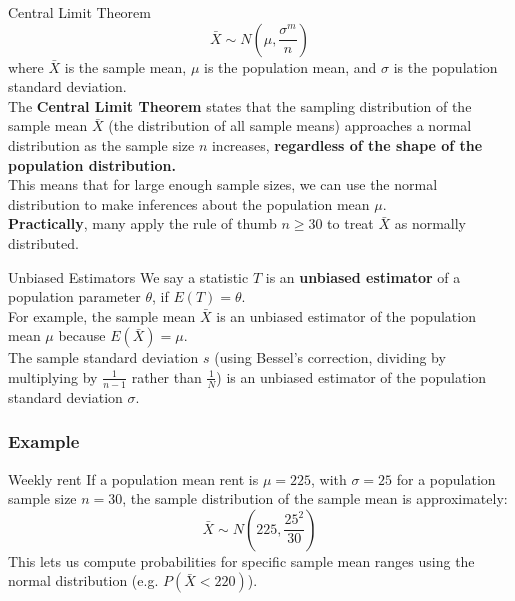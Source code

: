 \documentclass[9pt]{extarticle}
\begin{document}
\begin{definitionbox}{Central Limit Theorem}{}
    $$\bar{X} \sim N\left(\mu, \frac{\sigma^m}{n}\right)$$
    where $\bar{X}$ is the sample mean, $\mu$ is the population mean, and $\sigma$ is the population standard deviation.\\

    The \textbf{Central Limit Theorem} states that the sampling distribution of the sample mean $\bar{X}$ (the distribution of all sample means)  approaches a normal distribution as the sample size $n$ increases, \textbf{regardless of the shape of the population distribution.}\\

    This means that for large enough sample sizes, we can use the normal distribution to make inferences about the population mean $\mu$. \\

    \textbf{Practically}, many apply the rule of thumb $n \geq 30$ to treat $\bar{X}$ as normally distributed.
\end{definitionbox}


\begin{definitionbox}{Unbiased Estimators}{}
    We say a statistic $T$ is an \textbf{unbiased estimator} of a population parameter $\theta$,  if $E(T) = \theta$.\\

    For example, the sample mean $\bar{X}$ is an unbiased estimator of the population mean $\mu$ because $E(\bar{X}) = \mu$.\\

    The sample standard deviation $s$ (using Bessel's correction, dividing by multiplying by $\frac{1}{n-1}$ rather than $\frac{1}{N}$) is an unbiased estimator of the population standard deviation $\sigma$.
\end{definitionbox}

\subsubsection{Example}
\begin{examplebox}{Weekly rent}{}
    If a population mean rent is $\mu = 225$, with $\sigma = 25$ for a population sample size $n = 30$, the sample distribution of the sample mean is approximately:
    $$\bar{X} \sim N\left(225, \frac{25^2}{30}\right)$$
    This lets us compute probabilities for specific sample mean ranges using the normal distribution (e.g. $P(\bar{X} < 220)$).
\end{examplebox}
\end{document}
